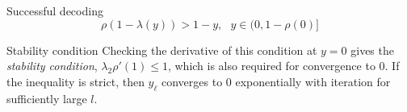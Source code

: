 \iffalse
\begin{frame}

\begin{block}{Successful decoding}
\[
\rho(1-\lambda(y)) > 1-y, \ \ \ y \in (0,1-\rho(0)]
\]
\end{block}

\begin{block}{Stability condition}
Checking the derivative of this condition at $y=0$ gives the \emph{stability condition}, $\lambda_2 \rho'(1) \leq 1$, which is also required for convergence to 0. If the inequality is strict, then $y_\ell$ converges to 0 exponentially with iteration for sufficiently large $l$.
\end{block}

\end{frame}
